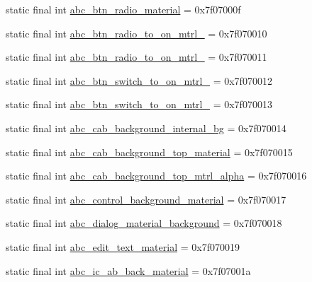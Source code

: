 \begin{DoxyCompactItemize}
static final int \mbox{\hyperlink{classandroid_1_1support_1_1design_1_1R_1_1drawable_a0eeed1992a879d933ae3d01f9507aa81}{abc\+\_\+btn\+\_\+radio\+\_\+material}} = 0x7f07000f
\item 
static final int \mbox{\hyperlink{classandroid_1_1support_1_1design_1_1R_1_1drawable_a72ec210aab2eff83e2f3a2880ceb665b}{abc\+\_\+btn\+\_\+radio\+\_\+to\+\_\+on\+\_\+mtrl\+\_}} = 0x7f070010
\item 
static final int \mbox{\hyperlink{classandroid_1_1support_1_1design_1_1R_1_1drawable_acaf233b381887822038a39dd0c57da41}{abc\+\_\+btn\+\_\+radio\+\_\+to\+\_\+on\+\_\+mtrl\+\_}} = 0x7f070011
\item 
static final int \mbox{\hyperlink{classandroid_1_1support_1_1design_1_1R_1_1drawable_ae521666a21ed2608a23eca5d22f96ee3}{abc\+\_\+btn\+\_\+switch\+\_\+to\+\_\+on\+\_\+mtrl\+\_}} = 0x7f070012
\item 
static final int \mbox{\hyperlink{classandroid_1_1support_1_1design_1_1R_1_1drawable_a5a3b8a81295542669662242978c175f7}{abc\+\_\+btn\+\_\+switch\+\_\+to\+\_\+on\+\_\+mtrl\+\_}} = 0x7f070013
\item 
static final int \mbox{\hyperlink{classandroid_1_1support_1_1design_1_1R_1_1drawable_a98b531b7ea20497704028ad747e030f1}{abc\+\_\+cab\+\_\+background\+\_\+internal\+\_\+bg}} = 0x7f070014
\item 
static final int \mbox{\hyperlink{classandroid_1_1support_1_1design_1_1R_1_1drawable_a42e17569e7d1bb789f0520f927545b90}{abc\+\_\+cab\+\_\+background\+\_\+top\+\_\+material}} = 0x7f070015
\item 
static final int \mbox{\hyperlink{classandroid_1_1support_1_1design_1_1R_1_1drawable_a41acf92ce9b10b18e42741a302b12976}{abc\+\_\+cab\+\_\+background\+\_\+top\+\_\+mtrl\+\_\+alpha}} = 0x7f070016
\item 
static final int \mbox{\hyperlink{classandroid_1_1support_1_1design_1_1R_1_1drawable_a519683d8b9d2044003074890024582d5}{abc\+\_\+control\+\_\+background\+\_\+material}} = 0x7f070017
\item 
static final int \mbox{\hyperlink{classandroid_1_1support_1_1design_1_1R_1_1drawable_a51203c7028bb30513590dcc5c4c3d9cd}{abc\+\_\+dialog\+\_\+material\+\_\+background}} = 0x7f070018
\item 
static final int \mbox{\hyperlink{classandroid_1_1support_1_1design_1_1R_1_1drawable_a90fa1994eabee1df8caf70fa65975771}{abc\+\_\+edit\+\_\+text\+\_\+material}} = 0x7f070019
\item 
static final int \mbox{\hyperlink{classandroid_1_1support_1_1design_1_1R_1_1drawable_ab1e4e8a337ffc7cb8522a649c351ccd5}{abc\+\_\+ic\+\_\+ab\+\_\+back\+\_\+material}} = 0x7f07001a

\end{DoxyCompactItemize}
